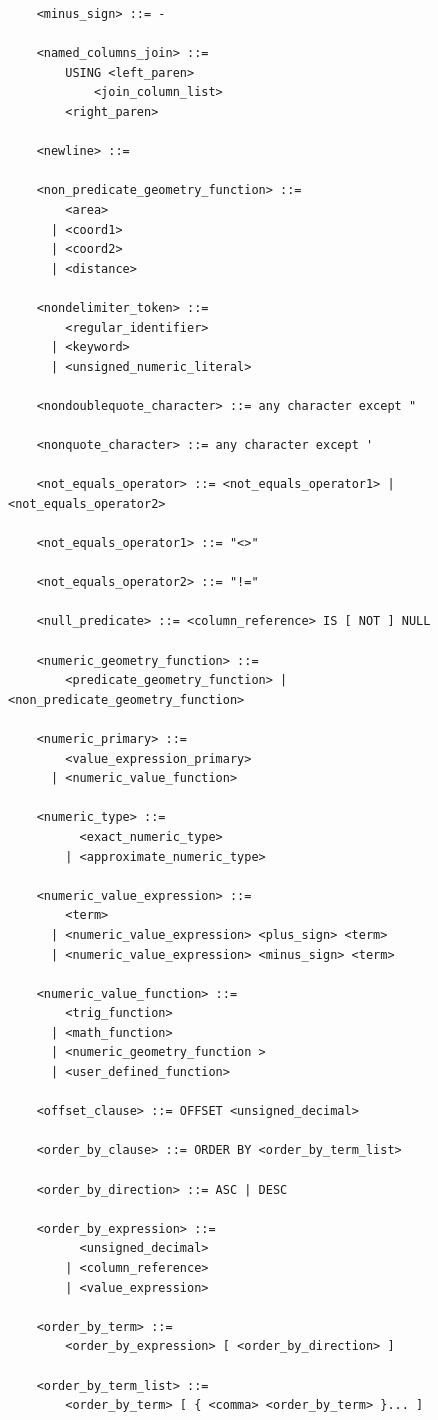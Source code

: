 \documentclass[11pt,a4paper]{ivoa}
\begin{document}
\begin{verbatim}
    <minus_sign> ::= -

    <named_columns_join> ::=
        USING <left_paren>
            <join_column_list>
        <right_paren>

    <newline> ::=

    <non_predicate_geometry_function> ::=
        <area>
      | <coord1>
      | <coord2>
      | <distance>

    <nondelimiter_token> ::=
        <regular_identifier>
      | <keyword>
      | <unsigned_numeric_literal>

    <nondoublequote_character> ::= any character except "

    <nonquote_character> ::= any character except '

    <not_equals_operator> ::= <not_equals_operator1> | <not_equals_operator2>

    <not_equals_operator1> ::= "<>"

    <not_equals_operator2> ::= "!="

    <null_predicate> ::= <column_reference> IS [ NOT ] NULL

    <numeric_geometry_function> ::=
        <predicate_geometry_function> | <non_predicate_geometry_function>

    <numeric_primary> ::=
        <value_expression_primary>
      | <numeric_value_function>

    <numeric_type> ::=
          <exact_numeric_type>
        | <approximate_numeric_type>

    <numeric_value_expression> ::=
        <term>
      | <numeric_value_expression> <plus_sign> <term>
      | <numeric_value_expression> <minus_sign> <term>

    <numeric_value_function> ::=
        <trig_function>
      | <math_function>
      | <numeric_geometry_function >
      | <user_defined_function>

    <offset_clause> ::= OFFSET <unsigned_decimal>

    <order_by_clause> ::= ORDER BY <order_by_term_list>

    <order_by_direction> ::= ASC | DESC

    <order_by_expression> ::=
          <unsigned_decimal>
        | <column_reference>
        | <value_expression>

    <order_by_term> ::=
        <order_by_expression> [ <order_by_direction> ]

    <order_by_term_list> ::=
        <order_by_term> [ { <comma> <order_by_term> }... ]


\end{verbatim}
\end{document}
